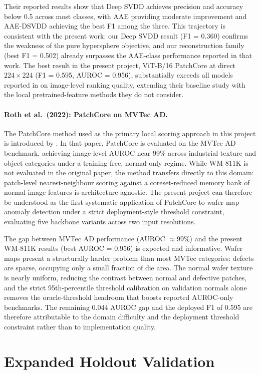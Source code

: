 \documentclass[11pt]{article}
\begin{document}
Their reported results show that Deep SVDD achieves precision and accuracy
below 0.5 across most classes, with AAE providing moderate improvement and
AAE-DSVDD achieving the best F1 among the three. This trajectory is
consistent with the present work: our Deep SVDD result (F1 = 0.360)
confirms the weakness of the pure hypersphere objective, and our
reconstruction family (best F1 = 0.502) already surpasses the AAE-class
performance reported in that work. The best result in the present project,
ViT-B/16 PatchCore at direct $224\!\times\!224$ (F1 = 0.595,
AUROC = 0.956), substantially exceeds all models reported in
\cite{jo2021oneclass} on image-level ranking quality, extending their
baseline study with the local pretrained-feature methods they do not
consider.

\paragraph{Roth et al.\ (2022): PatchCore on MVTec AD.}
The PatchCore method used as the primary local scoring approach in this
project is introduced by \cite{roth2022patchcore}. In that paper, PatchCore
is evaluated on the MVTec AD benchmark, achieving image-level
AUROC near 99\% across industrial texture and object categories under a
training-free, normal-only regime. While WM-811K is not evaluated in the
original paper, the method transfers directly to this domain: patch-level
nearest-neighbour scoring against a coreset-reduced memory bank of
normal-image features is architecture-agnostic. The present project can
therefore be understood as the first systematic application of PatchCore to
wafer-map anomaly detection under a strict deployment-style threshold
constraint, evaluating five backbone variants across two input resolutions.

The gap between MVTec AD performance (AUROC $\approx$99\%) and the present
WM-811K results (best AUROC = 0.956) is expected and informative. Wafer
maps present a structurally harder problem than most MVTec categories:
defects are sparse, occupying only a small fraction of die area. The normal
wafer texture is nearly uniform, reducing the contrast between normal and
defective patches, and the strict 95th-percentile threshold calibration on
validation normals alone removes the oracle-threshold headroom that
boosts reported AUROC-only benchmarks. The remaining 0.044 AUROC gap and
the deployed F1 of 0.595 are therefore attributable to the domain
difficulty and the deployment threshold constraint rather than to
implementation quality.
\section{Expanded Holdout Validation}
\end{document}
